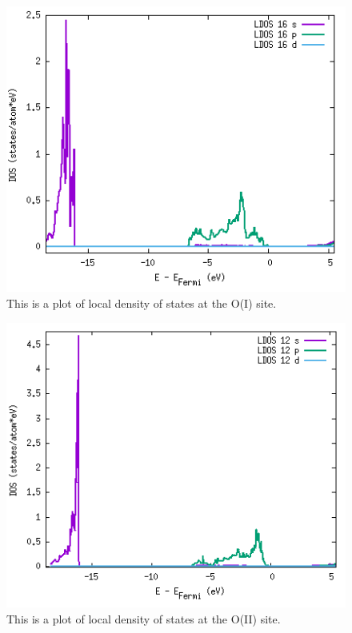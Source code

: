 \begin{figure}[H]
\includegraphics[width=\linewidth]{../fig/dosplot/ldos_O_I_primitive}\caption{This is a plot of local density of states at the O(I) site.}\label{fig:ldos_O_I}
\end{figure}

\begin{figure}[H]
\includegraphics[width=\linewidth]{../fig/dosplot/ldos_O_II_primitive}\caption{This is a plot of local density of states at the O(II) site.}\label{fig:ldos_O_II}
\end{figure}

